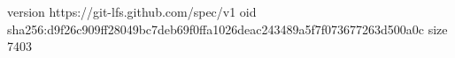 version https://git-lfs.github.com/spec/v1
oid sha256:d9f26c909ff28049bc7deb69f0ffa1026deac243489a5f7f073677263d500a0c
size 7403
